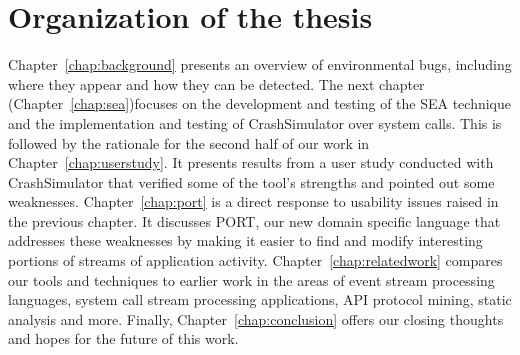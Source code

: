\section{Organization of the thesis}
\label{sec:organization}
Chapter~\ref{chap:background}
presents an overview of environmental bugs, including where they
appear and how they can be detected.
The next chapter (Chapter~\ref{chap:sea})focuses on the development and testing of the SEA technique and the implementation and testing of CrashSimulator over system calls.
This is followed by the rationale for the second half of our work in  Chapter~\ref{chap:userstudy}. It presents results
from a user study conducted with CrashSimulator that
verified some of the tool's strengths and pointed out some weaknesses.
Chapter~\ref{chap:port}
is a direct response to usability issues raised in the previous chapter. It  discusses PORT,
our new domain specific language that addresses these weaknesses by making
it easier to find and modify interesting portions of streams of
application activity.
Chapter~\ref{chap:relatedwork}
compares our tools and techniques to earlier work in the areas of event stream processing languages, system call stream processing applications, API protocol mining, static analysis and more.
Finally,
Chapter~\ref{chap:conclusion} offers our closing thoughts and hopes for
the future of this work.
